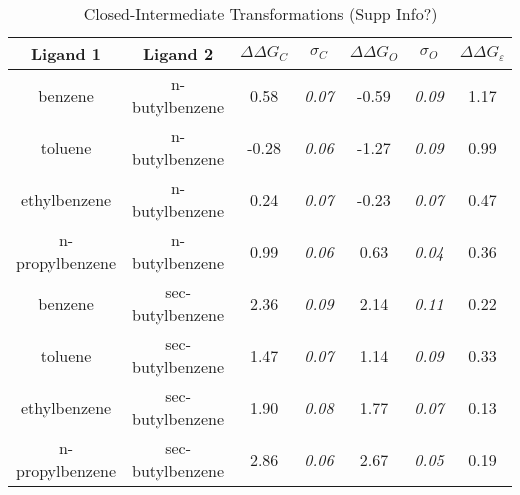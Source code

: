 \documentclass[T4paper.tex]{subfiles}
\begin{document}
\begin{table}[!htb]
\centering
\caption{Closed-Intermediate Transformations (Supp Info?)}
\label{tbl:C-I}
\begin{tabular}{|c|c|c|c|c|c|c|}
\hline
\textbf{Ligand 1}       & \textbf{Ligand 2}    & {\color[HTML]{800080} \boldmath$\Delta\Delta G_{C}$} & {\color[HTML]{800080} \boldmath$\sigma_{C}$} & {\color[HTML]{008000} \boldmath$\Delta\Delta G_{O}$} & {\color[HTML]{008000} \boldmath$\sigma_{O}$} & \boldmath$\Delta\Delta G_{\varepsilon}$            \\ \hline
\cellcolor[HTML]{800080}benzene         & \cellcolor[HTML]{00FFFF}n-butylbenzene   & 0.58                                   & \textit{0.07}                       & -0.59                                & \textit{0.09}                       & \cellcolor[HTML]{FFCCC9}1.17 \\ \hline
\cellcolor[HTML]{800080}toluene         & \cellcolor[HTML]{00FFFF}n-butylbenzene   & -0.28                                  & \textit{0.06}                       & -1.27                                & \textit{0.09}                       & \cellcolor[HTML]{9AFF99}0.99 \\ \hline
\cellcolor[HTML]{800080}ethylbenzene    & \cellcolor[HTML]{00FFFF}n-butylbenzene   & 0.24                                   & \textit{0.07}                       & -0.23                                & \textit{0.07}                       & \cellcolor[HTML]{9AFF99}0.47 \\ \hline
\cellcolor[HTML]{800080}n-propylbenzene & \cellcolor[HTML]{00FFFF}n-butylbenzene   & 0.99                                   & \textit{0.06}                       & 0.63                                 & \textit{0.04}                       & \cellcolor[HTML]{9AFF99}0.36 \\ \hline
\cellcolor[HTML]{800080}benzene         & \cellcolor[HTML]{00FFFF}sec-butylbenzene & 2.36                                   & \textit{0.09}                       & 2.14                                 & \textit{0.11}                       & \cellcolor[HTML]{9AFF99}0.22 \\ \hline
\cellcolor[HTML]{800080}toluene         & \cellcolor[HTML]{00FFFF}sec-butylbenzene & 1.47                                   & \textit{0.07}                       & 1.14                                 & \textit{0.09}                       & \cellcolor[HTML]{9AFF99}0.33 \\ \hline
\cellcolor[HTML]{800080}ethylbenzene    & \cellcolor[HTML]{00FFFF}sec-butylbenzene & 1.90                                   & \textit{0.08}                       & 1.77                                 & \textit{0.07}                       & \cellcolor[HTML]{9AFF99}0.13 \\ \hline
\cellcolor[HTML]{800080}n-propylbenzene & \cellcolor[HTML]{00FFFF}sec-butylbenzene & 2.86                                   & \textit{0.06}                       & 2.67                                 & \textit{0.05}                       & \cellcolor[HTML]{9AFF99}0.19 \\ \hline
\end{tabular}
\end{table}
\end{document}
